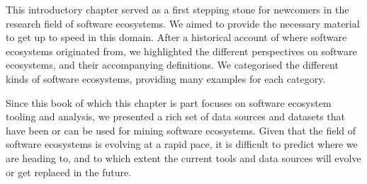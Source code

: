 
This introductory chapter served as a first stepping stone for newcomers in the research field of software ecosystems.
We aimed to provide the necessary material to get up to speed in this domain.
After a historical account of where software ecosystems originated from, we highlighted the different perspectives on software ecosystems, and their accompanying definitions.
We categorised the different kinds of software ecosystems, providing many examples for each category.

Since this book of which this chapter is part focuses on software ecosystem tooling and analysis, we presented a rich set of data sources and datasets that have been or can be used for mining software ecosystems. Given that the field of software ecosystems is evolving at a rapid pace, it is difficult to predict where we are heading to, and to which extent the current tools and data sources will evolve or get replaced in the future.




